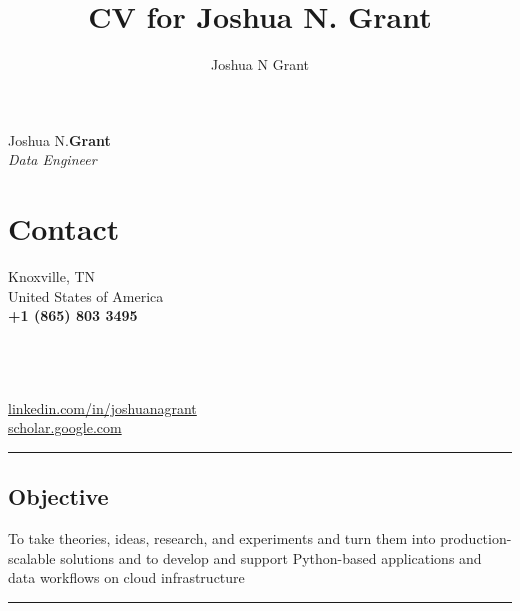 \documentclass[10pt]{article}%
\author{Joshua N Grant}
\title{CV for Joshua N. Grant}
\begin{document}
\begin{minipage}[ht]{.33\linewidth}%
  \setlength{\headsep}{-10pt}%
  \setlength{\voffset}{-0.75in}%
  {\Large Joshua N.\huge\textbf{Grant}} \\
   \large \textit{Data Engineer}
\end{minipage}
\begin{minipage}[ht]{.25\linewidth}%
  \section*{\faUser{} Contact}%
  Knoxville, TN \\
  United States of America \\
  \textbf{+1 (865) 803 3495} \faMobile{} \\
\end{minipage}
\begin{minipage}[ht]{.5\linewidth}%
  \href{mailto:jngrant@live.com}{\color{linkcolor}{jngrant@live.com \faEnvelope}} \\
  \href{https://notjustadatum.blogspot.com}{\color{linkcolor}{notjustadatum.blogspot.com \faBold}} \\
  \href{https://github.com/sempervent}{\color{linkcolor}{github.com/sempervent \faGithubAlt}} \\
  \href{https://www.linkedin.com/in/joshuanagrant}{\color{linkcolor} {\small linkedin.com/in/joshuanagrant} \faLinkedin} \\
  \href{https://scholar.google.com/citations?user=vs-HJQcAAAAJ&hl=en}{\color{linkcolor} {scholar.google.com \faPencil}}
\end{minipage}
\par\noindent\rule{\textwidth}{0.4pt}
\begin{center}
\section*{\faBullseye{} Objective}%
To take theories, ideas, research, and experiments and turn them into production-scalable solutions and to develop and support Python-based applications and data workflows on cloud infrastructure
\end{center}
\par\noindent\rule{\textwidth}{0.4pt}
\end{document}
